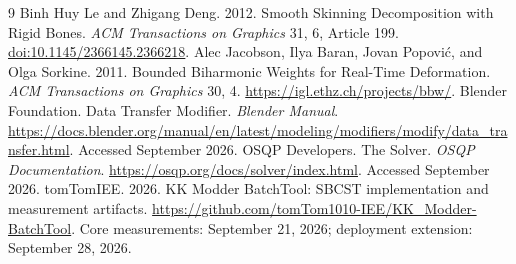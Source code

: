 \documentclass[10pt,twocolumn,letterpaper]{article}
\begin{document}
\begin{thebibliography}{9}
 Binh Huy Le and Zhigang Deng. 2012. Smooth Skinning Decomposition with Rigid Bones. \emph{ACM Transactions on Graphics} 31, 6, Article 199. \href{https://doi.org/10.1145/2366145.2366218}{doi:10.1145/2366145.2366218}.
 Alec Jacobson, Ilya Baran, Jovan Popovi\'{c}, and Olga Sorkine. 2011. Bounded Biharmonic Weights for Real-Time Deformation. \emph{ACM Transactions on Graphics} 30, 4. \url{https://igl.ethz.ch/projects/bbw/}.
 Blender Foundation. Data Transfer Modifier. \emph{Blender Manual}. \url{https://docs.blender.org/manual/en/latest/modeling/modifiers/modify/data_transfer.html}. Accessed September 2026.
 OSQP Developers. The Solver. \emph{OSQP Documentation}. \url{https://osqp.org/docs/solver/index.html}. Accessed September 2026.
 tomTomIEE. 2026. KK Modder BatchTool: SBCST implementation and measurement artifacts. \url{https://github.com/tomTom1010-IEE/KK_Modder-BatchTool}. Core measurements: September 21, 2026; deployment extension: September 28, 2026.
\end{thebibliography}
\end{document}
